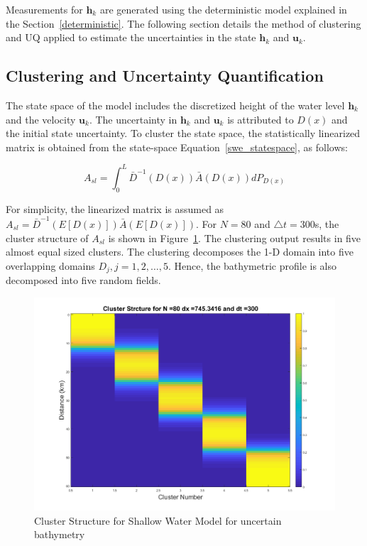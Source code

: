 Measurements for $\textbf{h}_{k}$ are generated using the deterministic model explained in the Section~\ref{deterministic}.  The following section details the method of clustering and UQ applied to estimate the uncertainties in the state $\textbf{h}_{k}$ and $\textbf{u}_k$.

\subsection{Clustering and Uncertainty Quantification}
 
 The state space of the model includes the discretized height of the water level $\textbf{h}_{k}$ and the velocity $\textbf{u}_k$.  The uncertainty in $\textbf{h}_k$ and $\textbf{u}_k$  is attributed to $D(x)$ and the initial state uncertainty. To cluster the state space, the statistically linearized matrix is obtained from the state-space Equation~\ref{swe_statespace}, as follows:
 
 \begin{equation}
 A_{sl}  = \int_0^L \bar{D}^{-1} (D(x)) \bar{A} (D(x)) dP_{D(x)}
\end{equation}  

For simplicity, the linearized matrix is assumed as $A_{sl} = \bar{D}^{-1} \left(E \left[ D(x) \right]\right) \bar{A} \left(E \left[ D(x) \right]\right) $. For $N=80$ and $\bigtriangleup t = 300$s, the cluster structure of $A_{sl}$ is shown in Figure~\ref{cluster_samp}. The clustering output results in five almost equal sized clusters. The clustering decomposes the 1-D domain into five overlapping domains $D_j, j=1,2,\ldots,5$. Hence, the bathymetric profile is also decomposed into five random fields. 

\begin{figure}[H]
\centering
\includegraphics[scale=0.4]{figures_2/samp}
\caption{Cluster Structure for Shallow Water Model for uncertain bathymetry}
\label{cluster_samp}
\end{figure}

